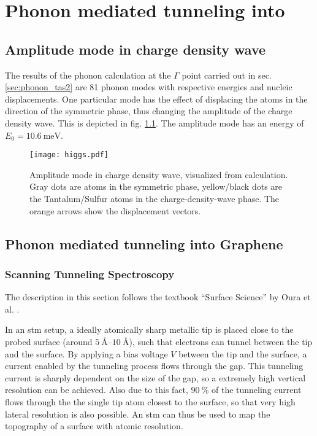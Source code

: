 \documentclass[main.tex]{subfiles}
\begin{document}
\chapter{Phonon mediated tunneling into \TaS}\label{ch:sts_gap_tas2}

\section{Amplitude mode in \TaS charge density wave}\label{sec:amplitude_mode_tas2}

The results of the phonon calculation at the \(\Gamma\) point carried out in sec. \ref{sec:phonon_tas2} are 81 phonon modes with respective energies and nucleic displacements.
One particular mode has the effect of displacing the atoms in the direction of the symmetric phase, thus changing the amplitude of the charge density wave.
This is depicted in fig. \ref{fig:amplitude_mode_tas2}.
The amplitude mode has an energy of \(E_0 = \SI{10.6}{\milli\eV}\).

\begin{figure}[b!]
    \centering
    \texttt{[image: higgs.pdf]}
    \caption{Amplitude mode in \TaS charge density wave, visualized from \QE calculation. Gray dots are atoms in the symmetric phase, yellow/black dots are the Tantalum/Sulfur atoms in the charge-density-wave phase. The orange arrows show the displacement vectors.}
    \label{fig:amplitude_mode_tas2}
\end{figure}

\section{Phonon mediated tunneling into Graphene}

\subsection{Scanning Tunneling Spectroscopy}\label{sub:sts}

The description in this section follows the textbook \enquote{Surface Science} by Oura et al. \cite{oura_surface_2003}.


In an \acrshort{stm} setup, a ideally atomically sharp metallic tip is placed close to the probed surface (around \(\SIrange{5}{10}{\angstrom}\)), such that electrons can tunnel between the tip and the surface.
By applying a bias voltage \(V\) between the tip and the surface, a current enabled by the tunneling process flows through the gap.
This tunneling current is sharply dependent on the size of the gap, so a extremely high vertical resolution can be achieved.
Also due to this fact, \(\SI{90}{\percent}\) of the tunneling current flows through the the single tip atom closest to the surface, so that very high lateral resolution is also possible.
An \acrshort{stm} can thus be used to map the topography of a surface with atomic resolution.
\end{document}
